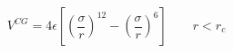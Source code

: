 


$$
 V^{CG} = 4 \epsilon \left[ \left(\frac{\sigma}{r}\right)^{12} - 
                       \left(\frac{\sigma}{r}\right)^6 \right]
                       \qquad r < r_c
$$


